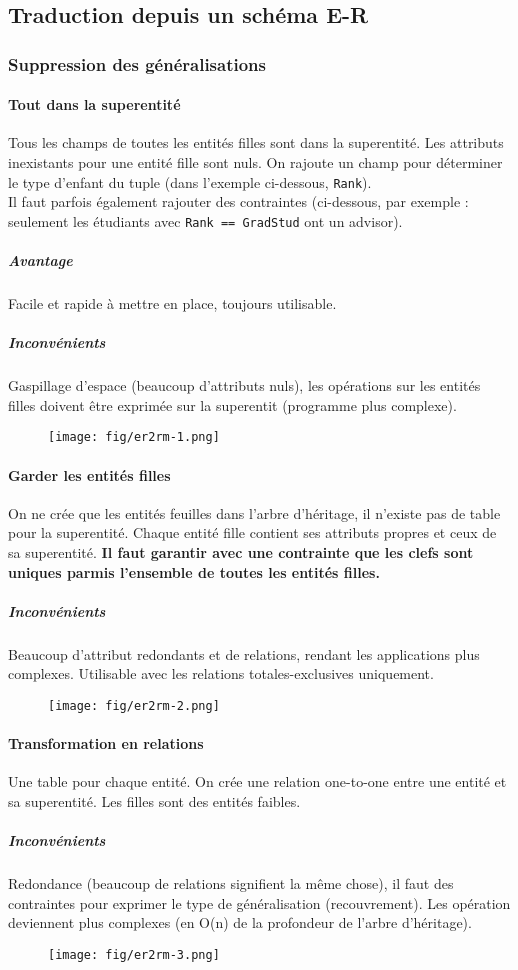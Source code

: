 \documentclass[a4paper]{article}
\begin{document}
\subsection{Traduction depuis un schéma E-R}
\subsubsection{Suppression des généralisations}
\paragraph{Tout dans la superentité}
Tous les champs de toutes les entités filles sont dans la superentité. Les attributs
inexistants pour une entité fille sont nuls. On rajoute un champ pour déterminer
le type d'enfant du tuple (dans l'exemple ci-dessous, \texttt{Rank}).\\

Il faut parfois également rajouter des contraintes (ci-dessous, par exemple :
seulement les étudiants avec \texttt{Rank == GradStud} ont un advisor).
\subparagraph{Avantage}
Facile et rapide à mettre en place, toujours utilisable.
\subparagraph{Inconvénients}
Gaspillage d'espace (beaucoup d'attributs nuls), les opérations sur les entités
filles doivent être exprimée sur la superentit (programme plus complexe).
\begin{figure}[H]
    \center
    \texttt{[image: fig/er2rm-1.png]}
\end{figure}

\paragraph{Garder les entités filles}
On ne crée que les entités feuilles dans l'arbre d'héritage, il n'existe pas de
table pour la superentité. Chaque entité fille contient ses attributs propres et
ceux de sa superentité. \textbf{Il faut garantir avec une contrainte que les
clefs sont uniques parmis l'ensemble de toutes les entités filles.}
\subparagraph{Inconvénients}
Beaucoup d'attribut redondants et de relations, rendant les applications plus complexes.
Utilisable avec les relations totales-exclusives uniquement.
\begin{figure}[H]
    \center
    \texttt{[image: fig/er2rm-2.png]}
\end{figure}

\paragraph{Transformation en relations}
Une table pour chaque entité. On crée une relation one-to-one entre une entité
et sa superentité. Les filles sont des entités faibles.
\subparagraph{Inconvénients}
Redondance (beaucoup de relations signifient la même chose), il faut des contraintes
pour exprimer le type de généralisation (recouvrement). Les opération deviennent plus
complexes (en O(n) de la profondeur de l'arbre d'héritage).
\begin{figure}[H]
    \center
    \texttt{[image: fig/er2rm-3.png]}
\end{figure}
\end{document}
